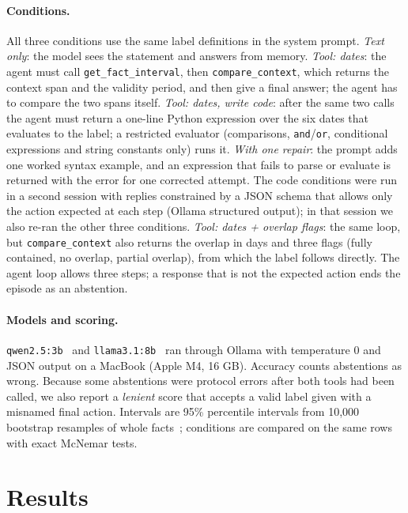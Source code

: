 \documentclass[11pt,a4paper]{article}
\newcommand{\code}[1]{\texttt{#1}}
\begin{document}
\paragraph{Conditions.} All three conditions use the same label definitions in the system prompt. \emph{Text only}:
the model sees the statement and answers from memory. \emph{Tool: dates}: the agent must call
\code{get\_fact\_interval}, then \code{compare\_context}, which returns the context span and the validity period, and
then give a final answer; the agent has to compare the two spans itself. \emph{Tool: dates, write code}: after the
same two calls the agent must return a one-line Python expression over the six dates that evaluates to the label; a
restricted evaluator (comparisons, \code{and}/\code{or}, conditional expressions and string constants only) runs it.
\emph{With one repair}: the prompt adds one worked syntax example, and an expression that fails to parse or evaluate
is returned with the error for one corrected attempt. The code conditions were run in a second session with
replies constrained by a JSON schema that allows only the action expected at each step (Ollama structured output);
in that session we also re-ran the other three conditions. \emph{Tool: dates + overlap flags}: the same
loop, but \code{compare\_context} also returns the overlap in days and three flags (fully contained, no overlap,
partial overlap), from which the label follows directly. The agent loop allows three steps; a response that is not
the expected action ends the episode as an abstention.

\paragraph{Models and scoring.} \code{qwen2.5:3b}~\cite{qwen2025qwen25} and \code{llama3.1:8b}~\cite{grattafiori2024llama3}
ran through Ollama with temperature 0 and JSON output on a MacBook (Apple M4, 16 GB). Accuracy counts abstentions as
wrong. Because some abstentions were protocol errors after both tools had been called, we also report a
\emph{lenient} score that accepts a valid label given with a misnamed final action. Intervals are 95\% percentile
intervals from 10,000 bootstrap resamples of whole facts~\cite{efron1993bootstrap}; conditions are compared on the same
rows with exact McNemar tests.

\section{Results}
\end{document}
